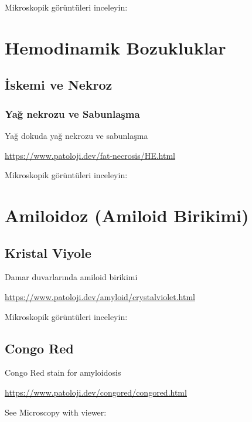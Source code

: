 \documentclass[
  letterpaper,
  DIV=11,
  numbers=noendperiod]{scrreprt}
\begin{document}
Mikroskopik görüntüleri inceleyin:

\hypertarget{hemodinamik-bozukluklar}{%
\chapter{Hemodinamik Bozukluklar}\label{hemodinamik-bozukluklar}}

\hypertarget{iskemi-ve-nekroz}{%
\section{İskemi ve Nekroz}\label{iskemi-ve-nekroz}}

\hypertarget{yaux11f-nekrozu-ve-sabunlaux15fma}{%
\subsection{Yağ nekrozu ve
Sabunlaşma}\label{yaux11f-nekrozu-ve-sabunlaux15fma}}

Yağ dokuda yağ nekrozu ve sabunlaşma

\url{https://www.patoloji.dev/fat-necrosis/HE.html}

Mikroskopik görüntüleri inceleyin:

\hypertarget{amiloidoz-amiloid-birikimi}{%
\chapter{Amiloidoz (Amiloid
Birikimi)}\label{amiloidoz-amiloid-birikimi}}

\hypertarget{kristal-viyole}{%
\section{Kristal Viyole}\label{kristal-viyole}}

Damar duvarlarında amiloid birikimi

\url{https://www.patoloji.dev/amyloid/crystalviolet.html}

Mikroskopik görüntüleri inceleyin:

\hypertarget{congo-red}{%
\section{Congo Red}\label{congo-red}}

Congo Red stain for amyloidosis

\url{https://www.patoloji.dev/congored/congored.html}

See Microscopy with viewer:
\end{document}
